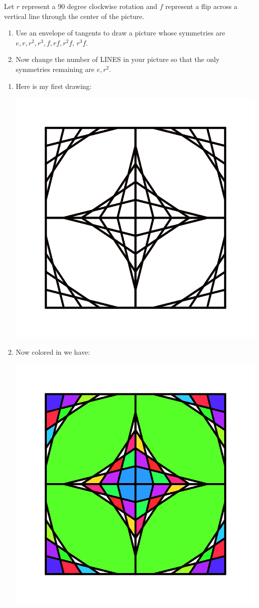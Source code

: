 \documentclass[noauthor,nooutcomes,12pt,hints]{ximera}
\begin{document}
\begin{question}
  Let $r$ represent a $90$ degree clockwise rotation and $f$
  represent a flip across a vertical line through the center of the
  picture.  
 \begin{enumerate}
 \item Use an envelope of tangents to draw a picture whose symmetries
   are $e,r,r^2,r^3,f,rf,r^2f$, $r^3f$.
 \item Now change the number of LINES in your picture so that the only
   symmetries remaining are $e,r^2$.
 \end{enumerate}
 \begin{freeResponse}
 \begin{enumerate}  
 \item Here is my first drawing:
   \begin{center}
     \includegraphics[width=.6\textwidth]{etD4.png}
   \end{center}
 \item Now colored in we have:
    \begin{center}
     \includegraphics[width=.6\textwidth]{ciR4.png}
    \end{center}
 \end{enumerate}
 \end{freeResponse}
\end{question}
\mynewpage
\end{document}
